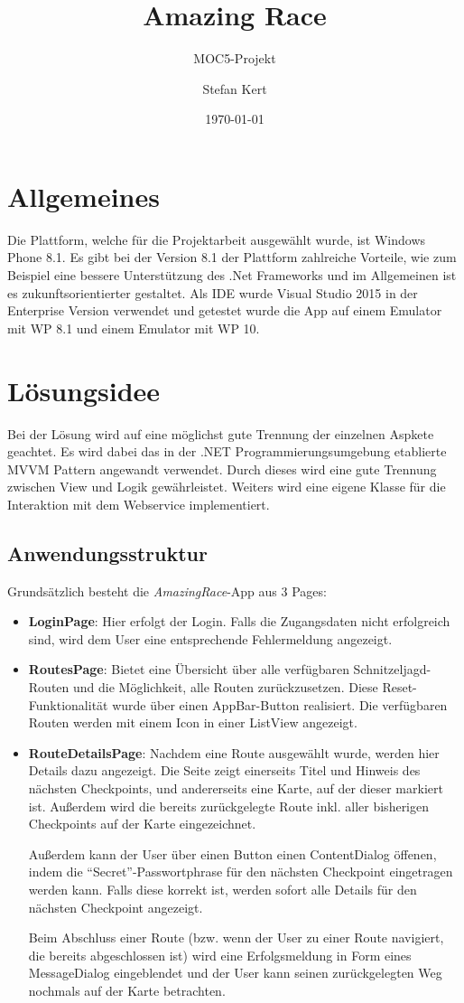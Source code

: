 \documentclass[a4paper,ngerman]{scrartcl}
\begin{document}
\title{Amazing Race}
\subtitle{MOC5-Projekt}
\author{Stefan Kert}
\date{\today}
\maketitle
\section{Allgemeines}
Die Plattform, welche für die Projektarbeit ausgewählt wurde, ist Windows Phone 8.1. Es gibt bei der Version 8.1 der Plattform zahlreiche Vorteile, wie zum Beispiel eine bessere Unterstützung des .Net Frameworks und im Allgemeinen ist es zukunftsorientierter gestaltet. Als IDE wurde Visual Studio 2015 in der Enterprise Version verwendet und getestet wurde die App auf einem Emulator mit WP 8.1 und einem Emulator mit WP 10. 

\section{Lösungsidee}
Bei der Lösung wird auf eine möglichst gute Trennung der einzelnen Aspkete geachtet. Es wird dabei das in der .NET Programmierungsumgebung etablierte MVVM Pattern angewandt verwendet. Durch dieses wird eine gute Trennung zwischen View und Logik gewährleistet. Weiters wird eine eigene Klasse für die Interaktion mit dem Webservice implementiert. 


\subsection{Anwendungsstruktur}
Grundsätzlich besteht die \textit{AmazingRace}-App aus 3 Pages:
\begin{itemize}
	\item \textbf{LoginPage}: Hier erfolgt der Login. Falls die Zugangsdaten nicht erfolgreich sind, wird dem User eine entsprechende Fehlermeldung angezeigt.
	\item \textbf{RoutesPage}: Bietet eine Übersicht über alle verfügbaren Schnitzeljagd-Routen und die Möglichkeit, alle Routen zurückzusetzen. Diese Reset-Funktionalität wurde über einen AppBar-Button realisiert. Die verfügbaren Routen werden mit einem Icon in einer ListView angezeigt.
	\item \textbf{RouteDetailsPage}: Nachdem eine Route ausgewählt wurde, werden hier Details dazu angezeigt. Die Seite zeigt einerseits Titel und Hinweis des nächsten Checkpoints, und andererseits eine Karte, auf der dieser markiert ist. Außerdem wird die bereits zurückgelegte Route inkl. aller bisherigen Checkpoints auf der Karte eingezeichnet.
	
Außerdem kann der User über einen Button einen ContentDialog öffenen, indem die "`Secret"'-Passwortphrase für den nächsten Checkpoint eingetragen werden kann. Falls diese korrekt ist, werden sofort alle Details für den nächsten Checkpoint angezeigt.

Beim Abschluss einer Route (bzw. wenn der User zu einer Route navigiert, die bereits abgeschlossen ist) wird eine Erfolgsmeldung in Form eines MessageDialog eingeblendet und der User kann seinen zurückgelegten Weg nochmals auf der Karte betrachten.
\end{itemize}
\end{document}
